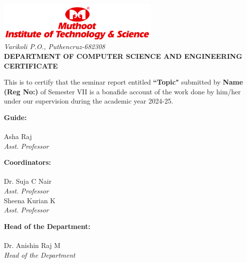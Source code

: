 \documentclass[a4paper,12pt]{template} %
\begin{document}
\newpage
\thispagestyle{plain}
\begin{center}
    \includegraphics[width=0.6\textwidth]{mits.jpg}\\[0.5cm]
    \textit{Varikoli P.O., Puthencruz-682308}\\[1cm]
    
    {\Large \textbf{DEPARTMENT OF COMPUTER SCIENCE AND ENGINEERING}}\\[1cm]
    
    {\LARGE \textbf{CERTIFICATE}}\\[2cm]
\end{center}
\vspace{0.5cm}
\noindent
This is to certify that the seminar report entitled \textbf{``Topic"} submitted by \textbf{Name (Reg No:)} of Semester VII is a bonafide account of the work done by him/her under our supervision during the academic year 2024-25.
\vspace{5cm}
\noindent
\begin{center}
\begin{minipage}[t]{0.3\textwidth}
    \textbf{Guide:}\\
    \vspace{0.1cm}\\
    Asha Raj\\
    \textit{Asst. Professor}
\end{minipage}%
\hfill
\begin{minipage}[t]{0.3\textwidth}
    \textbf{Coordinators:}\\
    \vspace{0.1cm}\\
    Dr. Suja C Nair\\
    \textit{Asst. Professor}\\
    
    Sheena Kurian K\\
    \textit{Asst. Professor}\\
\end{minipage}%
\hfill
\begin{minipage}[t]{0.3\textwidth}
    \textbf{Head of the Department:}\\
    \vspace{0.1cm}\\
    Dr. Anishin Raj M\\
    \textit{Head of the Department}
\end{minipage}%
\end{center}


\newpage
  
\newpage
     


\newpage
\tableofcontents 

\newpage
\listoffigures 

\newpage
\listoftables

\newpage
  

\newpage
          
 
 


\end{document}
